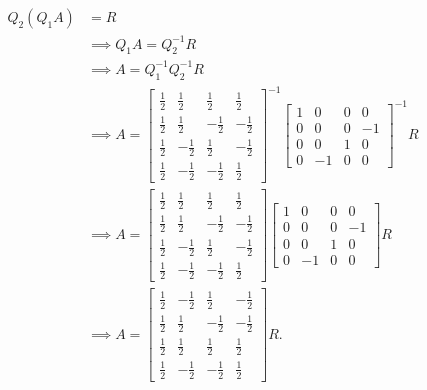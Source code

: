 \documentclass[letterpaper]{article}
\newcommand{\0}{\mathbf{0}}
\begin{document}
\begin{equation*}
    \begin{aligned}
        Q_2 (Q_1 A) &= R \\ 
            &\implies Q_1 A = Q_2^{-1} R \\ 
            &\implies A = Q_1^{-1} Q_2^{-1} R \\ 
            &\implies A =  \begin{bmatrix}
                \frac{1}{2} & \frac{1}{2} & \frac{1}{2} & \frac{1}{2} \\ 
                \frac{1}{2} & \frac{1}{2} & -\frac{1}{2} & -\frac{1}{2} \\ 
                \frac{1}{2} & -\frac{1}{2} & \frac{1}{2} & -\frac{1}{2} \\ 
                \frac{1}{2} & -\frac{1}{2} & -\frac{1}{2} & \frac{1}{2}
            \end{bmatrix}^{-1} \begin{bmatrix}
                1 & 0 & 0 &0\\ 
                0 & 0 & 0 &-1\\ 
                0 & 0 & 1 &0\\ 
                0 & -1 & 0 & 0
            \end{bmatrix}^{-1} R \\ 
            &\implies A = \begin{bmatrix}
                \frac{1}{2} & \frac{1}{2} & \frac{1}{2} & \frac{1}{2} \\ 
                \frac{1}{2} & \frac{1}{2} & -\frac{1}{2} & -\frac{1}{2} \\ 
                \frac{1}{2} & -\frac{1}{2} & \frac{1}{2} & -\frac{1}{2} \\ 
                \frac{1}{2} & -\frac{1}{2} & -\frac{1}{2} & \frac{1}{2}
            \end{bmatrix} \begin{bmatrix}
                1 & 0 & 0 &0\\ 
                0 & 0 & 0 &-1\\ 
                0 & 0 & 1 &0\\ 
                0 & -1 & 0 & 0
            \end{bmatrix} R \\
            &\implies A = \begin{bmatrix}
                \frac{1}{2}&-\frac{1}{2}&\frac{1}{2}&-\frac{1}{2} \\ 
                \frac{1}{2}&\frac{1}{2}&-\frac{1}{2}&-\frac{1}{2} \\ 
                \frac{1}{2}&\frac{1}{2}&\frac{1}{2}&\frac{1}{2} \\ 
                \frac{1}{2}&-\frac{1}{2}&-\frac{1}{2}&\frac{1}{2}
            \end{bmatrix} R.
    \end{aligned}
\end{equation*} 
\end{document}
